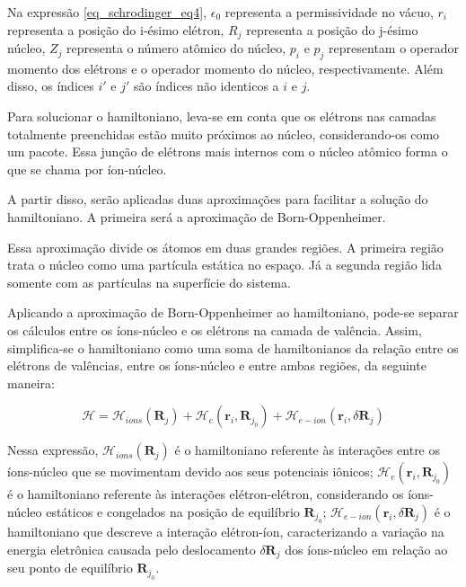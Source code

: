       \par Na expressão \eqref{eq_schrodinger_eq4}, $\epsilon_{0}$ representa a permissividade no vácuo, $r_{i}$ representa a posição do i-ésimo elétron, $R_{j}$ representa a posição do j-ésimo núcleo, $Z_{j}$ representa o número atômico do núcleo, $p_{i}$ e $p_{j}$ representam o operador momento dos elétrons e o operador momento do núcleo, respectivamente. Além disso, os índices $i'$ e $j'$ são índices não identicos a $i$ e $j$.

      \par Para solucionar o hamiltoniano, leva-se em conta que os elétrons nas camadas totalmente preenchidas estão muito próximos ao núcleo, considerando-os como um pacote. Essa junção de elétrons mais internos com o núcleo atômico forma o que se chama por íon-núcleo.
    
      \par A partir disso, serão aplicadas duas aproximações para facilitar a solução do hamiltoniano. A primeira será a aproximação de Born-Oppenheimer.\cite{qm_fis9}


      \par Essa aproximação divide os átomos em duas grandes regiões. A primeira região trata o núcleo como uma partícula estática no espaço. Já a segunda região lida somente com as partículas na superfície do sistema.

      \par Aplicando a aproximação de Born-Oppenheimer ao hamiltoniano, pode-se separar os cálculos entre os íons-núcleo e os elétrons na camada de valência. Assim, simplifica-se o hamiltoniano como uma soma de hamiltonianos da relação entre os elétrons de valências, entre os íons-núcleo e entre ambas regiões, da seguinte maneira:

      \begin{equation}\label{eq_schrodinger_eq5}
        \mathcal{H} = 
          \mathcal{H}_{ions} (\mathbf{R}_{j}) 
          + \mathcal{H}_{e}(\mathbf{r}_{i}, \mathbf{R}_{j_{0}})
          + \mathcal{H}_{e-ion}(\mathbf{r}_i, \delta\mathbf{R}_j)
      \end{equation}

      \par Nessa expressão, $\mathcal{H}_{ions}(\mathbf{R}_{j})$ é o hamiltoniano referente às interações entre os íons-núcleo que se movimentam devido aos seus potenciais iônicos; $\mathcal{H}_{e}(\mathbf{r}_{i},\mathbf{R}_{j_{0}})$ é o hamiltoniano referente às interações elétron-elétron, considerando os íons-núcleo estáticos e congelados na posição de equilíbrio $\mathbf{R}_{j_{0}}$; $\mathcal{H}_{e-ion}(\mathbf{r}_{i},\delta\mathbf{R}_{j})$ é o hamiltoniano que descreve a interação elétron-íon, caracterizando a variação na energia eletrônica causada pelo deslocamento $\delta\mathbf{R}_{j}$ dos íons-núcleo em relação ao seu ponto de equilíbrio $\mathbf{R}_{j_{0}}$.
      
